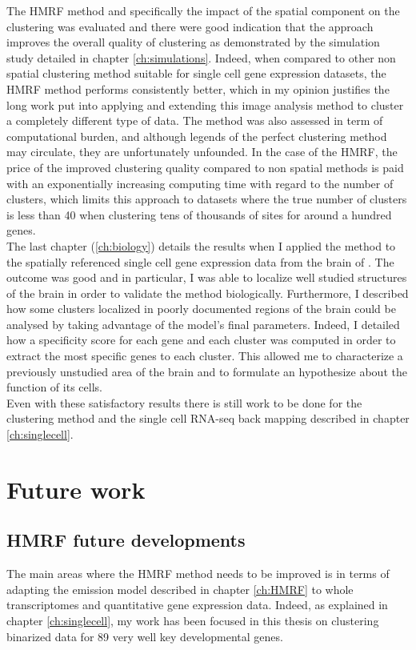  The HMRF method and specifically the impact of the spatial component on the clustering was evaluated and there were good indication that the approach improves the overall quality of clustering as demonstrated by the simulation study detailed in chapter \ref{ch:simulations}. Indeed, when compared to other non spatial clustering method suitable for single cell gene expression datasets, the HMRF method performs consistently better, which in my opinion justifies the long work put into applying and extending this image analysis method to cluster a completely different type of data. The method was also assessed in term of computational burden, and although legends of the perfect clustering method may circulate, they are unfortunately unfounded. In the case of the HMRF, the price of the improved clustering quality compared to non spatial methods is paid with an exponentially increasing computing time with regard to the number of clusters, which limits this approach to datasets where the true number of clusters is less than 40 when clustering tens of thousands of sites for around a hundred genes. \\
 
 The last chapter (\ref{ch:biology}) details the results when I applied the method to the spatially referenced single cell gene expression data from the brain of \platyfull{}. The outcome was good and in particular, I was able to localize well studied structures of the brain in order to validate the method biologically. Furthermore, I described how some clusters localized in poorly documented regions of the brain could be analysed by taking advantage of the model's final parameters. Indeed, I detailed how a specificity score for each gene and each cluster was computed in order to extract the most specific genes to each cluster. This allowed me to characterize a previously unstudied area of the brain and to formulate an hypothesize about the function of its cells. \\
 
  Even with these satisfactory results there is still work to be done for the clustering method and the single cell RNA-seq back mapping described in chapter \ref{ch:singlecell}.\\
  
\section{Future work}
  
  \subsection{HMRF future developments}
  The main areas where the HMRF method needs to be improved is in terms of adapting the emission model described in chapter \ref{ch:HMRF} to whole transcriptomes and quantitative gene expression data. Indeed, as explained in chapter \ref{ch:singlecell}, my work has been focused in this thesis on clustering binarized data for 89 very well key developmental genes.\\
  
